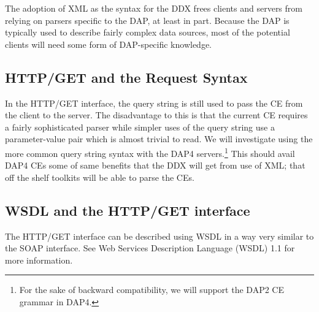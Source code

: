 \documentclass[justify]{dods-paper}
\begin{document}
The adoption of XML as the syntax for the DDX frees clients and
servers from relying on parsers specific to the DAP, at least in part.
Because the DAP is typically used to describe fairly complex data
sources, most of the potential clients will need some form of
DAP-specific knowledge. 


\subsection{HTTP/GET and the Request Syntax}

In the HTTP/GET interface, the query string is still used to pass the
CE from the client to the server. The disadvantage to this is that the
current CE requires a fairly sophisticated parser while simpler uses
of the query string use a parameter-value pair which is almost trivial
to read. We will investigate using the more common query string syntax
with the DAP4 servers.\footnote{For the sake of backward compatibility, we will
support the DAP2 CE grammar in DAP4.} This should avail DAP4 CEs some of
same benefits that the DDX will get from use of XML; that off the
shelf toolkits will be able to parse the CEs.

\subsection{WSDL and the HTTP/GET interface}

The HTTP/GET interface can be described using WSDL in a way very
similar to the SOAP interface. See Web Services Description Language (WSDL)
1.1\cite{christensen:wsdl1.1} for more information. 
\end{document}
